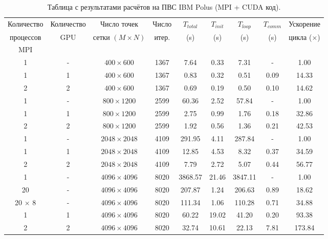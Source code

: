 \documentclass[12pt,a4paper]{article}
\begin{document}
    \begin{table}[h!]
        \centering
        \small
        \begin{tabular}{c|c|c|c|c|c|c|c|c}
            \hline
            Количество & Количество & Число точек & Число & \(T_{total}\) & \(T_{init}\) & \(T_{loop}\) & \(T_{comm}\) & Ускорение \\
            процессов & GPU & сетки $ (M \times N) $ & итер. & (s) & (s) & (s) & (s) & цикла ($\times$) \\
            MPI & & & & & & & &  \\ \hline
            1 & - & $400 \times 600$ & 1367 & 7.64 & 0.33 & 7.31 & - & 1.00 \\
            1 & 1 & $400 \times 600$ & 1367 & 0.83 & 0.32 & 0.51 & 0.09 & 14.33 \\
            2 & 2 & $400 \times 600$ & 1367 & 0.69 & 0.19 & 0.50 & 0.10 & 14.62 \\
            \hline
            1 & - & $800 \times 1200$ & 2599 & 60.36 & 2.52 & 57.84 & - & 1.00 \\
            1 & 1 & $800 \times 1200$ & 2599 & 2.75 & 0.99 & 1.76 & 0.18 & 32.86 \\
            2 & 2 & $800 \times 1200$ & 2599 & 1.92 & 0.56 & 1.36 & 0.21 & 42.53 \\
            \hline
            1 & - & $2048 \times 2048$ & 4109 & 291.95 & 4.11 & 287.84 & - & 1.00 \\
            1 & 1 & $2048 \times 2048$ & 4109 & 12.85 & 4.53 & 8.32 & 0.37 & 34.59 \\
            2 & 2 & $2048 \times 2048$ & 4109 & 7.79 & 2.72 & 5.07 & 0.44 & 56.77 \\ \hline
            1 & - & $4096 \times 4096$ & 8020 & 3868.57 & 21.46 & 3847.11 & -   & 1.00 \\
            20 & - & $4096 \times 4096$ & 8020 & 207.87 & 1.24 & 206.63 & 0.89 & 18.62 \\
            20 $\times$ 8 & - & $4096 \times 4096$ & 8020 & 111.34 & 1.06 & 110.28 & 0.71   & 34.88 \\
            1 & 1 & $4096 \times 4096$ & 8020 & 60.22 & 19.02 & 41.20 & 0.20 & 93.38 \\
            2 & 2 & $4096 \times 4096$ & 8020 & 32.74 & 10.61 & 22.13 & 7.81 & 173.84 \\
        \end{tabular}
        \caption{Таблица с результатами расчётов на ПВС IBM Polus (MPI + CUDA код).}
        \label{tab:cuda}
    \end{table}
\end{document}
